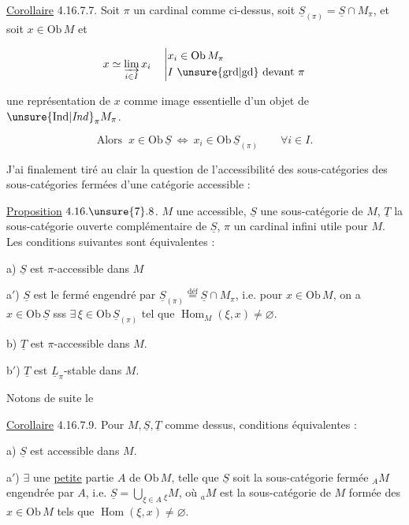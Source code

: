 \uline{Corollaire} 4.16.7.7. Soit $\pi$ un cardinal comme  ci-dessus,  soit $\underline S_{(\pi)}=\underline S\cap M_\pi$, et soit $x\in\mathrm{Ob}\,M$ et

\[
x\simeq\varinjlim_{i\in I}x_i
\quad\left|\begin{aligned}
 &x_i\in\mathrm{Ob}\,M_\pi\\
 &I\ \text{\unsure{grd|gd} devant }\pi
\end{aligned}\right.
\]

une représentation de $x$ comme \deleted{$\varinjlim$} image essentielle d'un objet de $\unsure{\mathrm{Ind}|\mathit{Ind}}_\pi M_\pi$.

\[\text{Alors }\ x\in\mathrm{Ob}\,\underline S\ \Longleftrightarrow\ x_i\in\mathrm{Ob}\,\underline S_{(\pi)}\qquad\forall i\in I .\]



J'ai finalement tiré au clair la question de l'accessibilité des sous-catégories   des sous-catégories fermées d'une catégorie accessible :

\uline{Proposition} $4.16.\unsure{7}.8$.  $M$ une  accessible, $\underline S$ une sous-catégorie  de $M$, $\underline T$ la sous-catégorie ouverte complémentaire de $\underline S$, $\pi$ un cardinal infini utile pour $M$. Les conditions suivantes sont équivalentes :

a) $\underline S$ est $\pi$-accessible dans $M$

a$'$) $\underline S$ est le fermé engendré par $\underline S_{(\pi)}\overset{\mathrm{déf}}{=}\underline S\cap M_\pi$, i.e. pour $x\in\mathrm{Ob}\,M$, on a $x\in\mathrm{Ob}\,\underline S$ sss $\exists\,\xi\in\mathrm{Ob}\,\underline S_{(\pi)}$ tel que $\operatorname{Hom}_M(\xi,x)\ne\varnothing$.

b) $\underline T$ est $\pi$-accessible dans $M$.

b$'$) $\underline T$ est $\underline L_\pi$-stable dans $M$.

Notons  de suite le 

\uline{Corollaire} 4.16.7.9. Pour $M,\underline S,\underline T$ comme dessus, conditions équivalentes :

a) $\underline S$ est accessible dans $M$.

a$'$) $\exists$ une \uline{petite} partie $A$ de $\mathrm{Ob}\,M$, telle que $\underline S$ soit la sous-catégorie fermée $ {}_A M$ engendrée par $A$, i.e. $\underline S=\bigcup_{\xi\in A}{}_\xi M$, où $ {}_a M$ est  la sous-catégorie  de $M$ formée des $x\in\mathrm{Ob}\,M$ tels que $\operatorname{Hom}(\xi,x)\ne\varnothing$.

